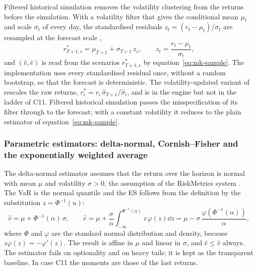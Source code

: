 Filtered historical simulation removes the volatility clustering from the returns before the simulation. With a volatility filter
that gives the conditional mean $\mu_t$ and scale $\sigma_t$ of every day, the standardised residuals $z_t=(r_t-\mu_t)/\sigma_t$ are
resampled at the forecast scale \citep{market:baronevosper1999},
\begin{equation}
r^{*}_{T+1,s}=\mu_{T+1}+\sigma_{T+1}\,z_s,\qquad z_t=\frac{r_t-\mu_t}{\sigma_t},
\label{eq:mk-fhs}
\end{equation}
and $(\widehat v,\widehat e)$ is read from the scenarios $r^*_{T+1,s}$ by equation~\eqref{eq:mk-sample}. The implementation uses every
standardised residual once, without a random bootstrap, so that the forecast is deterministic. The volatility-updated variant of
\citet{market:hullwhite1998} rescales the raw returns, $r^*_i=r_i\,\widehat\sigma_{T+1}/\widehat\sigma_i$, and is in the engine but
not in the ladder of C11. Filtered historical simulation passes the misspecification of its filter through to the forecast; with a
constant volatility it reduces to the plain estimator of equation~\eqref{eq:mk-sample}.

\subsubsection{Parametric estimators: delta-normal, Cornish--Fisher and the exponentially weighted average}
The delta-normal estimator assumes that the return over the horizon is normal with mean $\mu$ and volatility $\sigma>0$, the
assumption of the RiskMetrics system \citep{market:riskmetrics1996}. The VaR is the normal quantile and the ES follows from the
definition by the substitution $z=\Phi^{-1}(u)$:
\begin{equation}
\widehat v=\mu+\Phi^{-1}(\alpha)\,\sigma,\qquad
\widehat e=\mu+\frac{\sigma}{\alpha}\int_{-\infty}^{\Phi^{-1}(\alpha)}z\,\varphi(z)\dd z=\mu-\sigma\,\frac{\varphi\!\left(\Phi^{-1}(\alpha)\right)}{\alpha},
\label{eq:mk-dn}
\end{equation}
where $\Phi$ and $\varphi$ are the standard normal distribution and density, because $z\varphi(z)=-\varphi'(z)$. The result is affine
in $\mu$ and linear in $\sigma$, and $\widehat e\le\widehat v$ always. The estimator fails on optionality and on heavy tails; it is
kept as the transparent baseline. In case C11 the moments are those of the last \mkEstWin{} returns.

